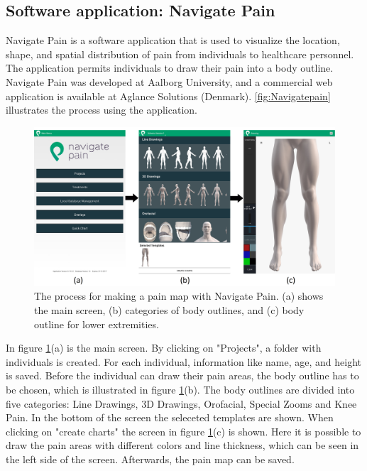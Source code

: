 \subsection{Software application: Navigate Pain} \label{sec:nav}
Navigate Pain is a software application that is used to visualize the location, shape, and spatial distribution of pain from individuals to healthcare personnel. The application permits individuals to draw their pain into a body outline. Navigate Pain was developed at Aalborg University, and a commercial web application is available at Aglance Solutions (Denmark).\citep{Solutions2015}
\autoref{fig:Navigatepain} illustrates the process using the application.

\begin{figure} [H]
\centering
\includegraphics[width=1\textwidth]{figures/Navigatepain}
\caption{The process for making a pain map with Navigate Pain. (a) shows the main screen, (b) categories of body outlines, and (c) body outline for lower extremities.}
\label{fig:Navigatepain}
\end{figure}

\noindent
In figure \ref{fig:Navigatepain}(a) is the main screen. By clicking on "Projects", a folder with individuals is created. For each individual, information like name, age, and height is saved. Before the individual can draw their pain areas, the body outline has to be chosen, which is illustrated in figure \ref{fig:Navigatepain}(b). The body outlines are divided into five categories: Line Drawings, 3D Drawings, Orofacial, Special Zooms and Knee Pain. In the bottom of the screen the seleceted templates are shown. When clicking on "create charts" the screen in figure \ref{fig:Navigatepain}(c) is shown. Here it is possible to draw the pain areas with different colors and line thickness, which can be seen in the left side of the screen. Afterwards, the pain map can be saved.


